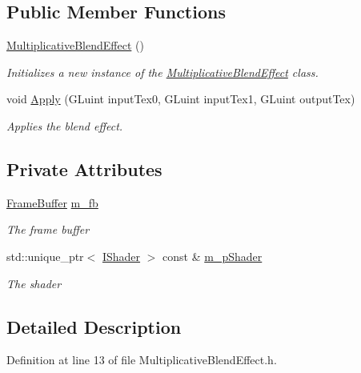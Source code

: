 \subsection*{Public Member Functions}
\begin{DoxyCompactItemize}
\item 
\hyperlink{class_multiplicative_blend_effect_a52b3c9ea6ef5f4fb1bdae35c66905108}{Multiplicative\+Blend\+Effect} ()
\begin{DoxyCompactList}\small\item\em Initializes a new instance of the \hyperlink{class_multiplicative_blend_effect}{Multiplicative\+Blend\+Effect} class. \end{DoxyCompactList}\item 
void \hyperlink{class_multiplicative_blend_effect_a91d3a879b34005bd869b1c81f01fd2d0}{Apply} (G\+Luint input\+Tex0, G\+Luint input\+Tex1, G\+Luint output\+Tex)
\begin{DoxyCompactList}\small\item\em Applies the blend effect. \end{DoxyCompactList}\end{DoxyCompactItemize}
\subsection*{Private Attributes}
\begin{DoxyCompactItemize}
\item 
\hyperlink{class_frame_buffer}{Frame\+Buffer} \hyperlink{class_multiplicative_blend_effect_ae0c0802014bfe79092d61ebfcbb3204c}{m\+\_\+fb}
\begin{DoxyCompactList}\small\item\em The frame buffer \end{DoxyCompactList}\item 
std\+::unique\+\_\+ptr$<$ \hyperlink{class_i_shader}{I\+Shader} $>$ const \& \hyperlink{class_multiplicative_blend_effect_a32258366995f3ff069b7ee81506c0118}{m\+\_\+p\+Shader}
\begin{DoxyCompactList}\small\item\em The shader \end{DoxyCompactList}\end{DoxyCompactItemize}


\subsection{Detailed Description}


Definition at line 13 of file Multiplicative\+Blend\+Effect.\+h.



